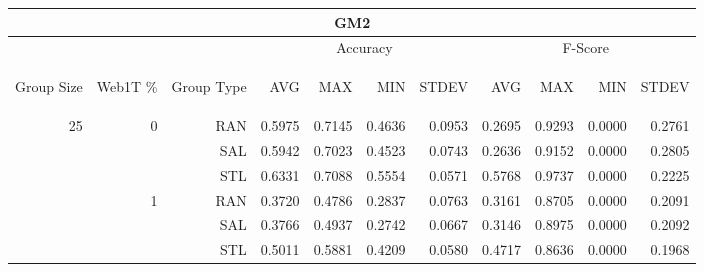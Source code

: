 \begin{center}
\begin{table}[htbp]
\begin{tabular}{ | r | r | r | r | r | r | r | r | r | r | r |}
\hline
\multicolumn{11}{|c|}{GM2}\\
\hline
 & & & \multicolumn{4}{|c|}{Accuracy} & \multicolumn{4}{|c|}{F-Score}\\ \cline{4-11}
\begin{sideways}Group Size\end{sideways} & \begin{sideways}Web1T \%\end{sideways} & \begin{sideways}Group Type\end{sideways} & \begin{sideways}AVG\end{sideways} & \begin{sideways}MAX\end{sideways} & \begin{sideways}MIN\end{sideways} & \begin{sideways}STDEV\end{sideways} & \begin{sideways}AVG\end{sideways} & \begin{sideways}MAX\end{sideways} & \begin{sideways}MIN\end{sideways} & \begin{sideways}STDEV\end{sideways}\\
\hline
\multirow{18}{*}{25}
 & \multirow{3}{*}{0} & RAN & 0.5975 & 0.7145 & 0.4636 & 0.0953 & 0.2695 & 0.9293 & 0.0000 & 0.2761\\ \cline{3-11}
 &   & SAL & 0.5942 & 0.7023 & 0.4523 & 0.0743 & 0.2636 & 0.9152 & 0.0000 & 0.2805\\ \cline{3-11}
 &   & STL & 0.6331 & 0.7088 & 0.5554 & 0.0571 & 0.5768 & 0.9737 & 0.0000 & 0.2225\\ \cline{2-11}
 & \multirow{3}{*}{1} & RAN & 0.3720 & 0.4786 & 0.2837 & 0.0763 & 0.3161 & 0.8705 & 0.0000 & 0.2091\\ \cline{3-11}
 &   & SAL & 0.3766 & 0.4937 & 0.2742 & 0.0667 & 0.3146 & 0.8975 & 0.0000 & 0.2092\\ \cline{3-11}
 &   & STL & 0.5011 & 0.5881 & 0.4209 & 0.0580 & 0.4717 & 0.8636 & 0.0000 & 0.1968\\ \cline{2-11}

\end{tabular}
\end{table}
\end{center}

